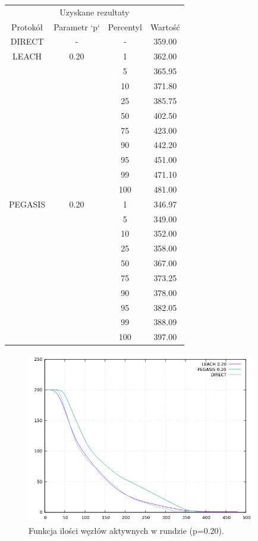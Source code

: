\documentclass[a4paper,12pt,twoside,openany]{report}
\begin{document}
\begin{longtable}{*{4}{c}}
\toprule
\multicolumn{4}{c}{Uzyskane rezultaty} \\
Protokół	& Parametr `p`	& Percentyl	& Wartość \\
\midrule
\endhead
DIRECT	& - 	& -	& 359.00 \\*
\midrule
LEACH	& 0.20	& 1	& 362.00 \\*
	&	& 5	& 365.95 \\*
	&	& 10	& 371.80 \\*
	&	& 25	& 385.75 \\*
	&	& 50	& 402.50 \\*
	&	& 75	& 423.00 \\*
	&	& 90	& 442.20 \\*
	&	& 95	& 451.00 \\*
	&	& 99	& 471.10 \\*
	&	& 100	& 481.00 \\*
\midrule
PEGASIS	& 0.20	& 1	& 346.97 \\*
	&	& 5	& 349.00 \\*
	&	& 10	& 352.00 \\*
	&	& 25	& 358.00 \\*
	&	& 50	& 367.00 \\*
	&	& 75	& 373.25 \\*
	&	& 90	& 378.00 \\*
	&	& 95	& 382.05 \\*
	&	& 99	& 388.09 \\*
	&	& 100	& 397.00 \\*
\bottomrule
\end{longtable}

\begin{figure}[H]
 \centering
 \includegraphics[width=10cm]{images/gnuplot/test_4/nodes_in_round_p020.png}
 \caption{Funkcja ilości węzłów aktywnych w rundzie (p=0.20).}
\end{figure}
\end{document}
